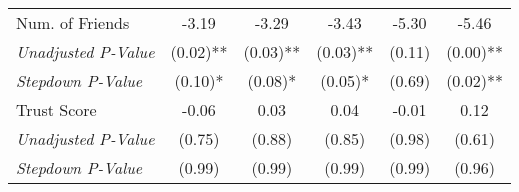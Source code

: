 \begin{tabular}{l c c c c c}
Num. of Friends & -3.19 & -3.29 & -3.43 & -5.30 & -5.46 \\
\quad \textit{Unadjusted P-Value} & (0.02)** & (0.03)** & (0.03)** & (0.11) & (0.00)** \\
\quad \textit{Stepdown P-Value} & (0.10)* & (0.08)* & (0.05)* & (0.69) & (0.02)** \\
Trust Score & -0.06 & 0.03 & 0.04 & -0.01 & 0.12 \\
\quad \textit{Unadjusted P-Value} & (0.75) & (0.88) & (0.85) & (0.98) & (0.61) \\
\quad \textit{Stepdown P-Value} & (0.99) & (0.99) & (0.99) & (0.99) & (0.96) \\
\bottomrule
\end{tabular}
